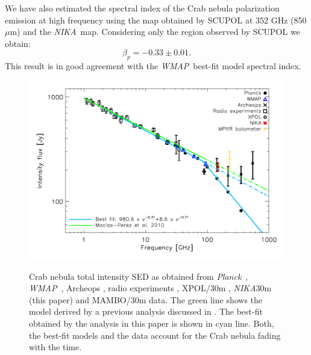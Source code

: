 \documentclass[twocolumn,traditabstract]{aa}
\def\NIKA{\textit{NIKA}}
\def\Planck{\textit{Planck}}
\def\WMAP{\textit{WMAP}}
\begin{document}
We have also estimated the spectral index of the Crab nebula polarization
emission at high frequency using the map obtained by SCUPOL at 352 GHz (850
$\mu$m) and the \NIKA\ map. Considering only the region observed by SCUPOL we
obtain:
\begin{equation}
\beta_p = -0.33 \pm 0.01.
\end{equation}
This result is in good agreement with the \WMAP\ best-fit model spectral index.

\begin{figure}
  \centering
          { \includegraphics[width=1\linewidth,keepaspectratio]{figures/Crab_SED_i_150.pdf}}
           \caption{Crab nebula total intensity SED as obtained from \Planck\ \citep{2015arXiv150702058P}, \WMAP\ \citep{2011ApJS..192...19W}, Archeops \citep{macias2007archeops}, radio experiments \citep{dmitrenko1970absolute, 1971IzVUZ..14..157V}, XPOL/30m \citep{aumont2010}, \NIKA\/30m (this paper) and MAMBO/30m \citep{2002A&A...386.1044B} data. The green line shows the model derived by a previous analysis discussed in \citep{macias2010}. The best-fit obtained by the analysis in this paper is shown in cyan line. Both, the best-fit models and the data account for the Crab nebula fading with the time.}
\label{crab_SED}		
  \end{figure} 
\end{document}
